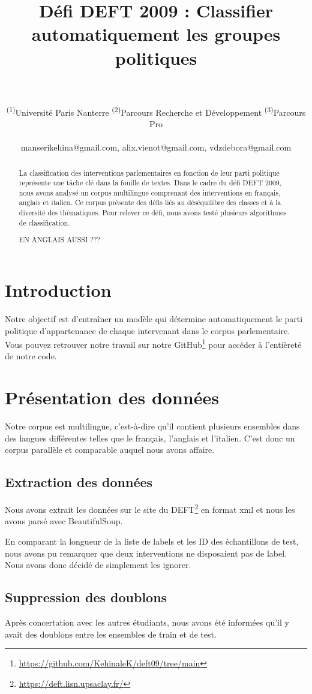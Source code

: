 \documentclass[11pt]{article}
\title{Défi DEFT 2009 : Classifier automatiquement les groupes politiques}
\author{
  \text{MANSERI Kéhina\textsuperscript{(1)(2)}}
  \text{SIRVEN-VIENOT Alix\textsuperscript{(1)(2)}}
  \text{VAN-DEN-ZANDE Débora\textsuperscript{(1)(3)}}
\\
\\
  \textsuperscript{(1)}Université Paris Nanterre
  \textsuperscript{(2)}Parcours Recherche et Développement
  \textsuperscript{(3)}Parcours Pro
\\
\\
    \small {
    manserikehina@gmail.com, alix.vienot@gmail.com, vdzdebora@gmail.com
    }
\\
}
\begin{document}
\maketitle
\begin{abstract}
La classification des interventions parlementaires en fonction de leur parti politique représente une tâche clé dans la fouille de textes. Dans le cadre du défi DEFT 2009, nous avons analysé un corpus multilingue comprenant des interventions en français, anglais et italien. Ce corpus présente des défis liés au déséquilibre des classes et à la diversité des thématiques. Pour relever ce défi, nous avons testé plusieurs algorithmes de classification. 

EN ANGLAIS AUSSI ???


\end{abstract}

\section{Introduction}
Notre objectif est d'entraîner un modèle qui détermine automatiquement le parti politique d’appartenance de chaque intervenant dans le corpus parlementaire. 
Vous pouvez retrouver notre travail sur notre GitHub\footnote{\url{https://github.com/KehinaleK/deft09/tree/main}} pour accéder à l'entièreté de notre code.

\section{Présentation des données}
Notre corpus est multilingue, c'est-à-dire qu'il contient plusieurs ensembles dans des langues différentes telles que le français, l'anglais et l'italien. C'est donc un corpus parallèle et comparable auquel nous avons affaire. 

\subsection{Extraction des données}
Nous avons extrait les données sur le site du DEFT\footnote{\url{https://deft.lisn.upsaclay.fr/}} en format xml et nous les avons parsé avec BeautifulSoup. 

En comparant la longueur de la liste de labels et les ID des échantillons de test, nous avons pu remarquer que deux interventions ne disposaient pas de label. Nous avons donc décidé de simplement les ignorer.


\subsection{Suppression des doublons}
Après concertation avec les autres étudiants, nous avons été informées qu'il y avait des doublons entre les ensembles de train et de test.
\end{document}
